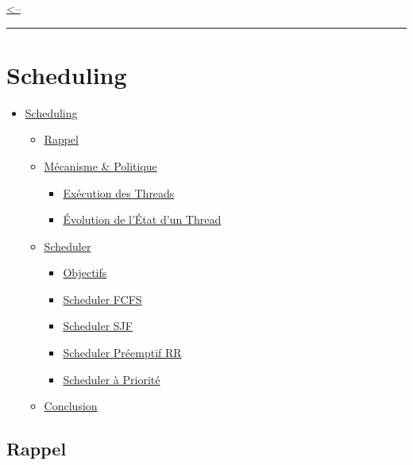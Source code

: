 \href{../README.md}{\textless--}

\begin{center}\rule{0.5\linewidth}{0.5pt}\end{center}

\section{Scheduling}\label{scheduling}

\begin{itemize}
\tightlist
\item
  \hyperref[scheduling]{Scheduling}

  \begin{itemize}
  \tightlist
  \item
    \hyperref[rappel]{Rappel}
  \item
    \hyperref[muxe9canisme--politique]{Mécanisme \& Politique}

    \begin{itemize}
    \tightlist
    \item
      \hyperref[exuxe9cution-des-threads]{Exécution des Threads}
    \item
      \hyperref[uxe9volution-de-luxe9tat-dun-thread]{Évolution de l'État
      d'un Thread}
    \end{itemize}
  \item
    \hyperref[scheduler]{Scheduler}

    \begin{itemize}
    \tightlist
    \item
      \hyperref[objectifs]{Objectifs}
    \item
      \hyperref[scheduler-fcfs]{Scheduler FCFS}
    \item
      \hyperref[scheduler-sjf]{Scheduler SJF}
    \item
      \hyperref[scheduler-pruxe9emptif-rr]{Scheduler Préemptif RR}
    \item
      \hyperref[scheduler-uxe0-priorituxe9]{Scheduler à Priorité}
    \end{itemize}
  \item
    \hyperref[conclusion]{Conclusion}
  \end{itemize}
\end{itemize}

\subsection{Rappel}\label{rappel}

